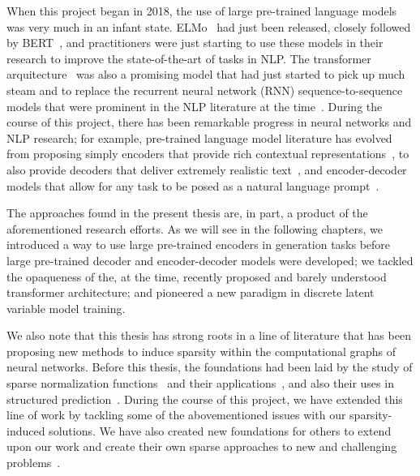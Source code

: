 When this project began in 2018, the use of large pre-trained
language models was very much in an infant state.
ELMo~\citep{peters2018deep} had just been released, closely followed
by BERT~\citep{devlin2018bert}, and practitioners were just starting
to use these models in their research to improve the state-of-the-art
of tasks in NLP. The transformer
arquitecture~\citep{vaswani2017attention} was also a promising model
that had just started to pick up much steam and to replace the
recurrent neural network (RNN) sequence-to-sequence models that were
prominent in the NLP literature at the
time~\citep{bahdanau2014neural}. During the course of this project,
there has been remarkable progress in neural networks and NLP
research; for example, pre-trained language model literature has
evolved from proposing simply encoders that provide rich contextual
representations~\citep{devlin2018bert}, to also provide decoders that
deliver extremely realistic text~\citep[GPT-3;][]{brown2020language},
and encoder-decoder models that allow for any task to be posed as a
natural language
prompt~\citep{raffel2020Exploringlimitstransfer,lewis2020BARTDenoisingSequencetoSequence}.

The approaches found in the present thesis are, in part, a product of
the aforementioned research efforts. As we will see in the following
chapters, we introduced a way to use large pre-trained encoders in
generation tasks before large pre-trained decoder and encoder-decoder
models were developed; we tackled the opaqueness of the, at the time,
recently proposed and barely understood transformer architecture; and
pioneered a new paradigm in discrete latent variable model training.

We also note that this thesis has strong roots in a line of
literature that has been proposing new methods to induce sparsity
within the computational graphs of neural networks. Before this
thesis, the foundations had been laid by the study of sparse
normalization functions~\citep{sparsemax,fusedmax,entmax} and their
applications~\citep{maruf2019selective,malaviya2018sparse}, and also
their uses in structured
prediction~\citep{niculae2018sparsemap,sparsemapcg}. During the
course of this project, we have extended this line of work by
tackling some of the abovementioned issues with our sparsity-induced
solutions. We have also created new foundations for others to extend
upon our work and create their own sparse approaches to new and
challenging problems~\citep{treviso2021PredictingAttentionSparsity,
    farinhas2022SparseCommunicationMixed}.





\cleardoublepage
\singlespacing
